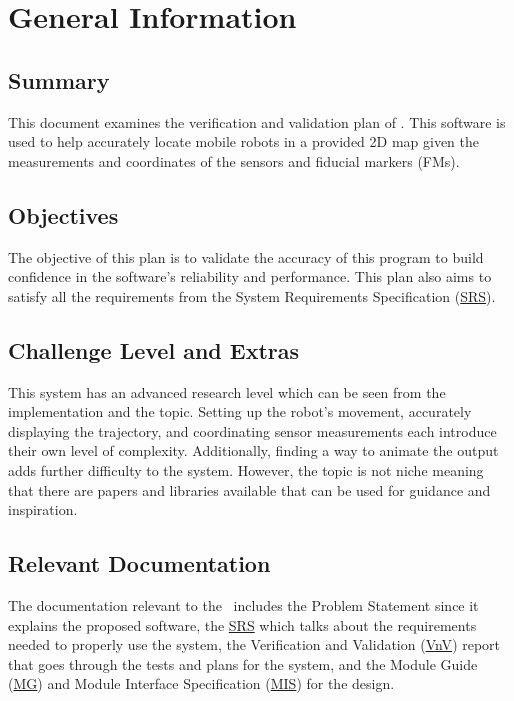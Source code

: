 \documentclass[12pt, titlepage]{article}
\begin{document}
\section{General Information}\label{sec_general}

\subsection{Summary}

This document examines the verification and validation plan of \progname. This software is used to help accurately locate mobile robots in a provided 2D map given the measurements and coordinates of the sensors and fiducial markers (FMs).

\subsection{Objectives}

The objective of this plan is to validate the accuracy of this program to build confidence in the software's reliability and performance. This plan also aims to satisfy all the requirements from the System Requirements Specification (\href{https://github.com/AliyahJimoh/2D-Localizer/blob/main/docs/SRS/SRS.pdf}{SRS}).  

\subsection{Challenge Level and Extras}

This system has an advanced research level which can be seen from the implementation and the topic. Setting up the robot’s movement, accurately displaying the trajectory, and coordinating sensor measurements each introduce their own level of complexity. Additionally, finding a way to animate the output adds further difficulty to the system. However, the topic is not niche meaning that there are papers and libraries available that can be used for guidance and inspiration.

\subsection{Relevant Documentation}

The documentation relevant to the \progname~includes the Problem Statement since it explains the proposed software, the \href{https://github.com/AliyahJimoh/2D-Localizer/blob/main/docs/SRS/SRS.pdf}{SRS} which talks about the requirements needed to properly use the system, the Verification and Validation (\href{https://github.com/AliyahJimoh/2D-Localizer/blob/main/docs/VnVReport/VnVReport.pdf}{VnV}) report that goes through the tests and plans for the system, and the Module Guide (\href{https://github.com/AliyahJimoh/2D-Localizer/blob/main/docs/Design/SoftArchitecture/MG.pdf}{MG}) and Module Interface Specification (\href{https://github.com/AliyahJimoh/2D-Localizer/blob/main/docs/Design/SoftDetailedDes/MIS.pdf}{MIS}) for the design.
\end{document}
